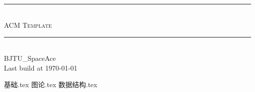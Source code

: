 ﻿\documentclass[12pt,a4paper]{article}
\begin{document}
    \pagestyle{fancy}
    \lhead{} 
    \chead{} 
    \cfoot{}
    \rfoot{\bfseries\thepage} 
    \renewcommand{\headrulewidth}{0.4pt} 
    \renewcommand{\footrulewidth}{0.4pt}
    \begin{titlepage}

	\pagestyle{empty}
	
        \begin{center}
        ~\\[160pt]
        
        \hrule\ \\[8pt]
        \fontsize{48pt}{\baselineskip}\selectfont  \textsc{ACM Template}\\[8pt]
        \hrule\ \\[340pt]

        \huge BJTU\_SpaceAce\\[8pt]
        \Large Last build at \today
        \end{center}
    \end{titlepage}

    \restoregeometry
	\tableofcontents
    \clearpage
	
     {基础.tex}
     {图论.tex}
	 {数据结构.tex}
		
	
	
\end{document}

